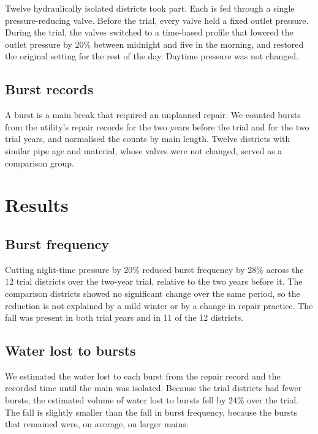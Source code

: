 \documentclass{article}
\begin{document}
Twelve hydraulically isolated districts took part. Each is fed through a single
pressure-reducing valve. Before the trial, every valve held a fixed outlet
pressure. During the trial, the valves switched to a time-based profile that
lowered the outlet pressure by 20\% between midnight and five in the morning,
and restored the original setting for the rest of the day. Daytime pressure was
not changed.

\subsection{Burst records}
\label{sec:method-records}

A burst is a main break that required an unplanned repair. We counted bursts
from the utility's repair records for the two years before the trial and for
the two trial years, and normalised the counts by main length. Twelve districts
with similar pipe age and material, whose valves were not changed, served as a
comparison group.

\section{Results}
\label{sec:results}

\subsection{Burst frequency}
\label{sec:results-bursts}

Cutting night-time pressure by 20\% reduced burst frequency by 28\% across the
12 trial districts over the two-year trial, relative to the two years before
it. The comparison districts showed no significant change over the same
period, so the reduction is not explained by a mild winter or by a change in
repair practice. The fall was present in both trial years and in 11 of the 12
districts.

\subsection{Water lost to bursts}
\label{sec:results-losses}

We estimated the water lost to each burst from the repair record and the
recorded time until the main was isolated. Because the trial districts had
fewer bursts, the estimated volume of water lost to bursts fell by 24\% over
the trial. The fall is slightly smaller than the fall in burst frequency,
because the bursts that remained were, on average, on larger mains.
\end{document}
